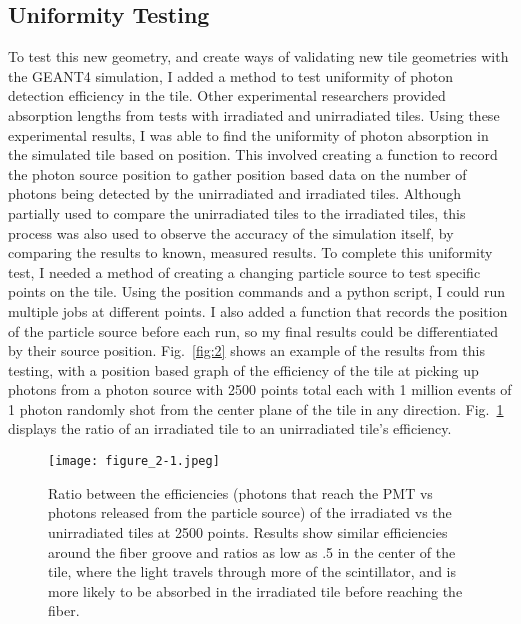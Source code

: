 \subsection{Uniformity Testing}
	To test this new geometry, and create ways of validating new tile geometries with the GEANT4 simulation, I added a method to test uniformity of photon detection efficiency in the tile. Other experimental researchers provided absorption lengths from tests with irradiated and unirradiated tiles. Using these experimental results, I was able to find the uniformity of photon absorption in the simulated tile based on position. This involved creating a function to record the photon source position to gather position based data on the number of photons being detected by the unirradiated and irradiated tiles. Although partially used to compare the unirradiated tiles to the irradiated tiles, this process was also used to observe the accuracy of the simulation itself, by comparing the results to known, measured results. To complete this uniformity test, I needed a method of creating a changing particle source to test specific points on the tile. Using the position commands and a python script, I could run multiple jobs at different points. I also added a function that records the position of the particle source before each run, so my final results could be differentiated by their source position. Fig.~\ref{fig:2} shows an example of the results from this testing, with a position based graph of the efficiency of the tile at picking up photons from a photon source with 2500 points total each with 1 million events of 1 photon randomly shot from the center plane of the tile in any direction. Fig.~\ref{fig:3} displays the ratio of an irradiated tile to an unirradiated tile’s efficiency.

\begin{figure}[h!]
  \begin{center}
    \texttt{[image: figure\_2-1.jpeg]}
    \caption{Ratio between the efficiencies (photons that reach the PMT vs photons released from the particle source) of the irradiated vs the unirradiated tiles at 2500 points. Results show similar efficiencies around the fiber groove and ratios as low as .5 in the center of the tile, where the light travels through more of the scintillator, and is more likely to be absorbed in the irradiated tile before reaching the fiber.}
    \label{fig:3}
  \end{center}
\end{figure}

